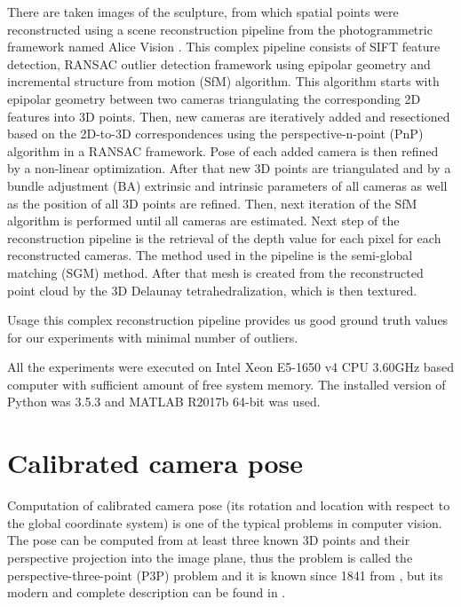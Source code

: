 There are \importAppLADIONumCameras{} taken images of the sculpture, from which \importAppLADIONumPoints{} spatial points were reconstructed using a scene reconstruction pipeline from the photogrammetric framework named Alice Vision \cite{ALiceVision}.
This complex pipeline consists of SIFT \cite{sift} feature detection, RANSAC \cite{ransac} outlier detection framework using epipolar geometry and incremental structure from motion (SfM) algorithm.
This algorithm starts with epipolar geometry between two cameras triangulating the corresponding 2D features into 3D points.
Then, new cameras are iteratively added and resectioned based on the 2D-to-3D correspondences using the perspective-n-point (PnP) \cite{pnp} algorithm in a RANSAC \cite{ransac} framework.
Pose of each added camera is then refined by a non-linear optimization.
After that new 3D points are triangulated and by a bundle adjustment (BA) extrinsic and intrinsic parameters of all cameras as well as the position of all 3D points are refined.
Then, next iteration of the SfM algorithm is performed until all cameras are estimated.
Next step of the reconstruction pipeline is the retrieval of the depth value for each pixel for each reconstructed cameras.
The method used in the pipeline is the semi-global matching (SGM) \cite{sgm} method.
After that mesh is created from the reconstructed point cloud by the 3D Delaunay tetrahedralization, which is then textured.

Usage this complex reconstruction pipeline provides us good ground truth values for our experiments with minimal number of outliers.

All the experiments were executed on Intel Xeon E5-1650 v4 CPU 3.60GHz based computer with sufficient amount of free system memory.
The installed version of Python was 3.5.3 and MATLAB R2017b 64-bit was used.

\section{Calibrated camera pose}
Computation of calibrated camera pose (its rotation and location with respect to the global coordinate system) is one of the typical problems in computer vision.
The pose can be computed from at least three known 3D points and their perspective projection into the image plane, thus the problem is called the perspective-three-point (P3P) problem and it is known since 1841 from \cite{p3p1841}, but its modern and complete description can be found in \cite{P3P}.

